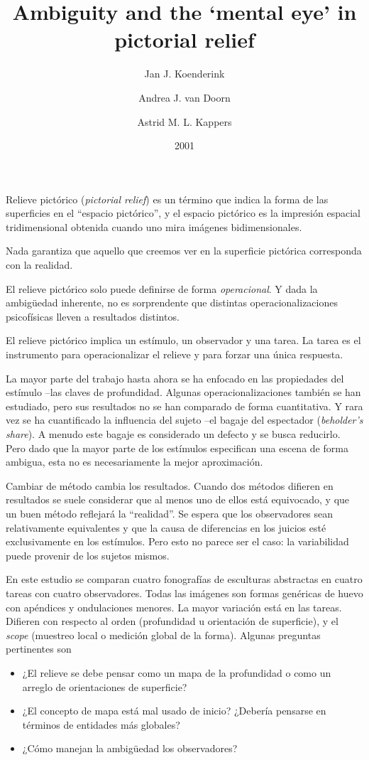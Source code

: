 \documentclass[a4paper,12pt]{article}
\title{Ambiguity and the `mental eye' in pictorial relief}
\author{Jan J. Koenderink\and Andrea J. van Doorn\and Astrid M. L. Kappers}
\date{2001}
\begin{document}
{\scshape\bfseries \maketitle}

Relieve pictórico ({\itshape pictorial relief}) es un término que indica la forma de las superficies en el ``espacio pictórico'', y el espacio pictórico es la impresión espacial tridimensional obtenida cuando uno mira imágenes bidimensionales. 

Nada garantiza que aquello que creemos ver en la superficie pictórica corresponda con la realidad.

El relieve pictórico solo puede definirse de forma {\itshape operacional}. Y dada la ambigüedad inherente, no es sorprendente que distintas operacionalizaciones psicofísicas lleven a resultados distintos.

El relieve pictórico implica un estímulo, un observador y una tarea. La tarea es el instrumento para operacionalizar el relieve y para forzar una única respuesta. 

La mayor parte del trabajo hasta ahora se ha enfocado en las propiedades del estímulo --las claves de profundidad. Algunas operacionalizaciones también se han estudiado, pero sus resultados no se han comparado de forma cuantitativa. Y rara vez se ha cuantificado la influencia del sujeto --el bagaje del espectador ({\itshape beholder's share}). A menudo este bagaje es considerado un defecto y se busca reducirlo. Pero dado que la mayor parte de los estímulos especifican una escena de forma ambigua, esta no es necesariamente la mejor aproximación.

Cambiar de método cambia los resultados. Cuando dos métodos difieren en resultados se suele considerar que al menos uno de ellos está equivocado, y que un buen método reflejará la ``realidad''. Se espera que los observadores sean relativamente equivalentes y que la causa de diferencias en los juicios esté exclusivamente en los estímulos. Pero esto no parece ser el caso: la variabilidad puede provenir de los sujetos mismos.

En este estudio se comparan cuatro fonografías de esculturas abstractas en cuatro tareas con cuatro observadores. Todas las imágenes son formas genéricas de huevo con apéndices y ondulaciones menores. La mayor variación está en las tareas. Difieren con respecto al orden (profundidad u orientación de superficie), y el {\itshape scope} (muestreo local o medición global de la forma). Algunas preguntas pertinentes son
\begin{itemize}
	\item ¿El relieve se debe pensar como un mapa de la profundidad o como un arreglo de orientaciones de superficie?
	\item ¿El concepto de mapa está mal usado de inicio? ¿Debería pensarse en términos de entidades más globales?
	\item ¿Cómo manejan la ambigüedad los observadores?
\end{itemize}
\end{document}
